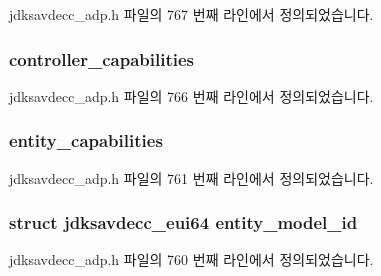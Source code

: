 jdksavdecc\+\_\+adp.\+h 파일의 767 번째 라인에서 정의되었습니다.

\subsubsection[{\texorpdfstring{controller\+\_\+capabilities}{controller_capabilities}}]{ controller\+\_\+capabilities}\hypertarget{structjdksavdecc__adpdu_a66f07a4a428e308f20990a0e6bbfea0c}{}\label{structjdksavdecc__adpdu_a66f07a4a428e308f20990a0e6bbfea0c}


jdksavdecc\+\_\+adp.\+h 파일의 766 번째 라인에서 정의되었습니다.

\subsubsection[{\texorpdfstring{entity\+\_\+capabilities}{entity_capabilities}}]{ entity\+\_\+capabilities}\hypertarget{structjdksavdecc__adpdu_ae3350328f131c8382ba5030939a2a484}{}\label{structjdksavdecc__adpdu_ae3350328f131c8382ba5030939a2a484}


jdksavdecc\+\_\+adp.\+h 파일의 761 번째 라인에서 정의되었습니다.

\subsubsection[{\texorpdfstring{entity\+\_\+model\+\_\+id}{entity_model_id}}]{\setlength{\rightskip}{0pt plus 5cm}struct {\bf jdksavdecc\+\_\+eui64} entity\+\_\+model\+\_\+id}\hypertarget{structjdksavdecc__adpdu_a2d1d52d1ec5c6100b61acf3daa452c56}{}\label{structjdksavdecc__adpdu_a2d1d52d1ec5c6100b61acf3daa452c56}


jdksavdecc\+\_\+adp.\+h 파일의 760 번째 라인에서 정의되었습니다.

